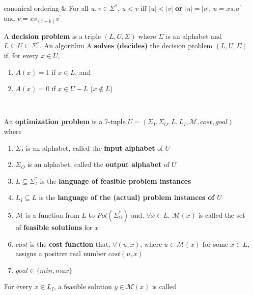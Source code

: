 \begin{tabu}
  canonical \newline ordering & For all $u,v \in \Sigma^*$, $u < v$ iff $| u
  | < | v |$ {\bf or} $| u | = | v |$, $u = xs_iu^\prime$
  and $v = xs_{(i+k)}v^\prime$ \\ \hline
 {A {\bf decision problem} is a triple $(L, U, \Sigma)$ where $\Sigma$ is an
   alphabet and $L \subseteq U \subseteq \Sigma^*$. An algorithm A {\bf solves
     (decides)} the decision problem $(L, U, \Sigma)$ if, for every $x \in U$,
  \begin{enumerate} \itemsep1pt \parskip0pt  \vspace{-\medskipamount}
  \item $A(x) = 1$ if $x \in L$, and
  \item $A(x) = 0$ if $x \in U - L$ ($x \notin L$)
  \vspace{-\medskipamount} \end{enumerate}
  } \\ \hline
 {An {\bf optimization problem} is a 7-tuple $U = (\Sigma_I, \Sigma_O, L, L_I,
   \mathcal{M}, cost, goal)$ where
   \begin{enumerate} \itemsep1pt \parskip0pt  \vspace{-\medskipamount}
   \item $\Sigma_I$ is an alphabet, called the {\bf input alphabet} of $U$
   \item $\Sigma_O$ is an alphabet, called the {\bf output alphabet} of $U$
   \item $L \subseteq \Sigma_I^*$ is the {\bf language of feasible problem
     instances}
   \item $L_I \subseteq L$ is the {\bf language of the (actual) problem
     instances of $U$}
   \item $\mathcal{M}$ is a function from $L$ to $Pot(\Sigma_O^*)$ and, $\forall
     x \in L$, $\mathcal{M}(x)$ is called the set of {\bf feasible solutions}
     for $x$
   \item $cost$ is the {\bf cost function} that, $\forall (u, x)$, where
     $u \in \mathcal{M}(x)$ for some $x \in L$, assigns a positive real number
     $cost(u, x)$
   \item $goal \in \{min, max\}$
   \vspace{-\medskipamount} \end{enumerate}
   For every $x \in L_I$, a feasible solution $y \in \mathcal{M}(x)$ is called
}
\end{tabu}
